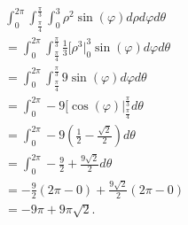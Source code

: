 \documentclass{report}
\begin{document}
    \begin{align*}
        &\int_{0}^{2\pi}\int_{\frac{\pi}{4}}^{\frac{\pi}{3}} \int_{0}^{3} \rho^{2}\sin{\left(\varphi\right)}d\rho d\varphi d\theta  \\
        &=\int_{0}^{2\pi}\int_{\frac{\pi}{4}}^{\frac{\pi}{3}} \frac{1}{3}\bigg[\rho^{3}\bigg|_0^{3}\sin{\left(\varphi\right)}d\varphi d\theta  \\
        &=\int_{0}^{2\pi}\int_{\frac{\pi}{4}}^{\frac{\pi}{3}} 9\sin{\left(\varphi\right)}d\varphi d\theta  \\ 
        &=\int_{0}^{2\pi} -9\bigg[\cos{\left(\varphi\right)}\bigg|_{\frac{\pi}{4}}^{\frac{\pi}{3}}d\theta  \\ 
        &=\int_{0}^{2\pi} -9\left(\frac{1}{2}-\frac{\sqrt{2}}{2}\right)d\theta  \\ 
        &=\int_{0}^{2\pi} -\frac{9}{2}+\frac{9\sqrt{2}}{2}d\theta  \\ 
        &=-\frac{9}{2}(2\pi - 0) + \frac{9\sqrt{2}}{2}(2\pi-0) \\
        &=-9\pi + 9\pi\sqrt{2}
    .\end{align*}
\end{document}
